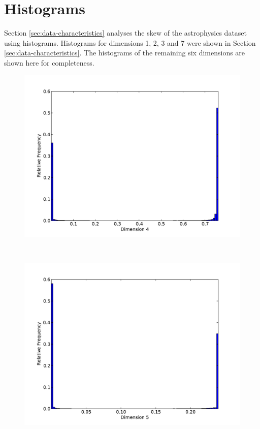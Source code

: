 \section{Histograms}
\label{sec:app-histograms}

Section \ref{sec:data-characteristics} analyses the skew of the astrophysics dataset using histograms. Histograms for dimensions 1, 2, 3 and 7 were shown in Section \ref{sec:data-characteristics}. The histograms of the remaining six dimensions are shown here for completeness.

\begin{figure}[h]
	\begin{center}
		\begin{subfloat}{%
			\includegraphics[scale=0.36]{figures/histograms/astrophysics_500000_3.pdf}
		}
		\end{subfloat}~
		\begin{subfloat}{%
			\includegraphics[scale=0.36]{figures/histograms/astrophysics_500000_4.pdf}
		}
		\end{subfloat}~
	\end{center}
\end{figure}

